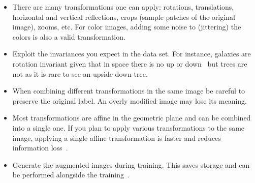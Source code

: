 \begin{itemize}
	\item There are many transformations one can apply: rotations, translations, horizontal and vertical reflections, crops (sample patches of the original image), zooms, etc. For color images, adding some noise to (jittering) the colors is also a valid transformation.

	\item Exploit the invariances you expect in the data set. For instance, galaxies are rotation invariant given that in space there is no up or down~\cite{Dieleman2015} but trees are not as it is rare to see an upside down tree.

	\item When combining different transformations in the same image be careful to preserve the original label. An overly modified image may lose its meaning. 

	\item Most transformations are affine in the geometric plane and can be combined into a single one. If you plan to apply various transformations to the same image, applying a single affine transformation is faster and reduces information loss~\cite{Dieleman2015}.

	\item Generate the augmented images during training. This saves storage and can be performed alongside the training~\cite{Krizhevsky2012}.
	
\end{itemize}


